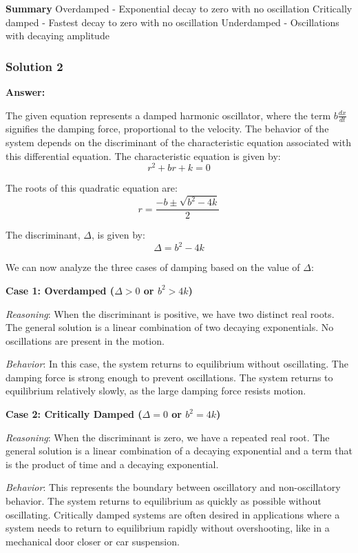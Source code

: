 \documentclass{article}
\begin{document}
\noindent \textbf{Summary}
Overdamped - Exponential decay to zero with no oscillation
Critically damped - Fastest decay to zero with no oscillation
Underdamped - Oscillations with decaying amplitude


\subsubsection{Solution 2}
\noindent \textbf{Answer:}

The given equation represents a damped harmonic oscillator, where the term  $b\frac{dx}{dt}$ signifies the damping force, proportional to the velocity. The behavior of the system depends on the discriminant of the characteristic equation associated with this differential equation. The characteristic equation is given by:
\begin{equation*}
r^2 + br + k = 0
\end{equation*}

The roots of this quadratic equation are:
\begin{equation*}
r = \frac{-b \pm \sqrt{b^2 - 4k}}{2}
\end{equation*}

The discriminant, $\Delta$, is given by:
\begin{equation*}
\Delta = b^2 - 4k
\end{equation*}

We can now analyze the three cases of damping based on the value of $\Delta$:

\noindent \textbf{Case 1: Overdamped ($\Delta > 0$ or $b^2 > 4k$)}

\textit{Reasoning}: When the discriminant is positive, we have two distinct real roots. The general solution is a linear combination of two decaying exponentials. No oscillations are present in the motion.

\textit{Behavior}: In this case, the system returns to equilibrium without oscillating. The damping force is strong enough to prevent oscillations. The system returns to equilibrium relatively slowly, as the large damping force resists motion.

\noindent \textbf{Case 2: Critically Damped ($\Delta = 0$ or $b^2 = 4k$)}

\textit{Reasoning}: When the discriminant is zero, we have a repeated real root. The general solution is a linear combination of a decaying exponential and a term that is the product of time and a decaying exponential.

\textit{Behavior}: This represents the boundary between oscillatory and non-oscillatory behavior. The system returns to equilibrium as quickly as possible without oscillating. Critically damped systems are often desired in applications where a system needs to return to equilibrium rapidly without overshooting, like in a mechanical door closer or car suspension.
\end{document}
